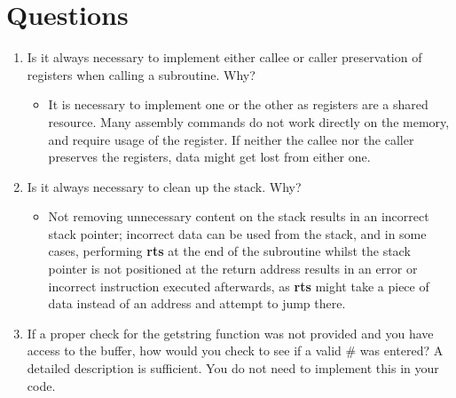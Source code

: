 \documentclass[12pt]{article}
\begin{document}
\section{Questions}
\begin{enumerate}
    \item Is it always necessary to implement either callee or caller preservation of registers when calling a subroutine. Why?
    \begin{itemize}
        \item It is necessary to implement one or the other as registers are a shared resource. Many assembly commands do not work directly on the memory, and require usage of the register. If neither the callee nor the caller preserves the registers, data might get lost from either one.
    \end{itemize}
    \item Is it always necessary to clean up the stack. Why?
    \begin{itemize}
        \item Not removing unnecessary content on the stack results in an incorrect stack pointer; incorrect data can be used from the stack, and in some cases, performing \textbf{rts} at the end of the subroutine whilst the stack pointer is not positioned at the return address results in an error or incorrect instruction executed afterwards, as \textbf{rts} might take a piece of data instead of an address and attempt to jump there.
    \end{itemize}
    \item If a proper check for the getstring function was not provided and you have access to the buffer, how would you check to see if a valid \# was entered?  A detailed description is sufficient. You do not need to implement this in your code.
\end{enumerate}
\end{document}
